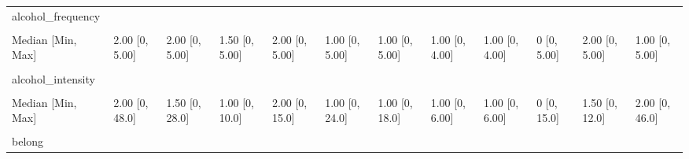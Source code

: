 \documentclass[
  single column]{article}
\begin{document}
\begin{landscape}
\begin{longtable}[t]{llllllllllll}
alcohol\_frequency &  &  &  &  &  &  &  &  &  &  & \\
\addlinespace
\cellcolor{gray!10}{Mean (SD)} & \cellcolor{gray!10}{2.05 (1.33)} & \cellcolor{gray!10}{2.20 (1.38)} & \cellcolor{gray!10}{1.66 (1.35)} & \cellcolor{gray!10}{1.99 (1.34)} & \cellcolor{gray!10}{1.62 (1.34)} & \cellcolor{gray!10}{1.37 (1.34)} & \cellcolor{gray!10}{1.32 (1.28)} & \cellcolor{gray!10}{1.55 (1.18)} & \cellcolor{gray!10}{0.112 (0.557)} & \cellcolor{gray!10}{2.02 (1.37)} & \cellcolor{gray!10}{1.51 (1.38)}\\
Median [Min, Max] & 2.00 [0, 5.00] & 2.00 [0, 5.00] & 1.50 [0, 5.00] & 2.00 [0, 5.00] & 1.00 [0, 5.00] & 1.00 [0, 5.00] & 1.00 [0, 4.00] & 1.00 [0, 4.00] & 0 [0, 5.00] & 2.00 [0, 5.00] & 1.00 [0, 5.00]\\
\cellcolor{gray!10}{Missing} & \cellcolor{gray!10}{449 (2.1\%)} & \cellcolor{gray!10}{40 (2.9\%)} & \cellcolor{gray!10}{8 (3.0\%)} & \cellcolor{gray!10}{78 (3.9\%)} & \cellcolor{gray!10}{92 (2.5\%)} & \cellcolor{gray!10}{30 (2.7\%)} & \cellcolor{gray!10}{4 (2.9\%)} & \cellcolor{gray!10}{5 (5.7\%)} & \cellcolor{gray!10}{22 (3.3\%)} & \cellcolor{gray!10}{19 (3.3\%)} & \cellcolor{gray!10}{23 (3.1\%)}\\
alcohol\_intensity &  &  &  &  &  &  &  &  &  &  & \\
\cellcolor{gray!10}{Mean (SD)} & \cellcolor{gray!10}{2.36 (2.25)} & \cellcolor{gray!10}{1.83 (1.84)} & \cellcolor{gray!10}{1.66 (1.40)} & \cellcolor{gray!10}{2.08 (1.89)} & \cellcolor{gray!10}{1.65 (1.80)} & \cellcolor{gray!10}{1.58 (2.07)} & \cellcolor{gray!10}{1.60 (1.57)} & \cellcolor{gray!10}{1.50 (1.30)} & \cellcolor{gray!10}{0.387 (1.52)} & \cellcolor{gray!10}{1.80 (1.55)} & \cellcolor{gray!10}{2.24 (3.30)}\\
\addlinespace
Median [Min, Max] & 2.00 [0, 48.0] & 1.50 [0, 28.0] & 1.00 [0, 10.0] & 2.00 [0, 15.0] & 1.00 [0, 24.0] & 1.00 [0, 18.0] & 1.00 [0, 6.00] & 1.00 [0, 6.00] & 0 [0, 15.0] & 1.50 [0, 12.0] & 2.00 [0, 46.0]\\
\cellcolor{gray!10}{Missing} & \cellcolor{gray!10}{2766 (12.8\%)} & \cellcolor{gray!10}{168 (12.3\%)} & \cellcolor{gray!10}{57 (21.1\%)} & \cellcolor{gray!10}{279 (13.8\%)} & \cellcolor{gray!10}{647 (17.5\%)} & \cellcolor{gray!10}{235 (21.5\%)} & \cellcolor{gray!10}{26 (19.1\%)} & \cellcolor{gray!10}{17 (19.5\%)} & \cellcolor{gray!10}{345 (52.4\%)} & \cellcolor{gray!10}{75 (13.0\%)} & \cellcolor{gray!10}{159 (21.4\%)}\\
belong &  &  &  &  &  &  &  &  &  &  & \\

\end{longtable}
\end{landscape}
\end{document}

